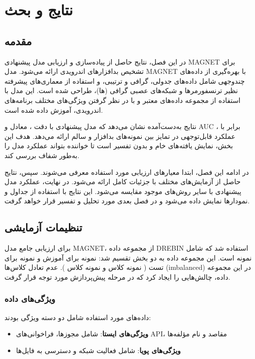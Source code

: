 \chapter{نتایج و بحث}\label{chap4}

\section{مقدمه}
در این فصل، نتایج حاصل از پیاده‌سازی و ارزیابی مدل پیشنهادی MAGNET برای تشخیص بدافزارهای اندرویدی ارائه می‌شود. مدل MAGNET با بهره‌گیری از داده‌های چندوجهی شامل داده‌های جدولی، گرافی و ترتیبی، و استفاده از معماری‌های پیشرفته نظیر ترنسفورمرها و شبکه‌های عصبی گرافی (ها)، طراحی شده است. این مدل با استفاده از مجموعه داده‌های معتبر و با در نظر گرفتن ویژگی‌های مختلف برنامه‌های اندرویدی، آموزش داده شده است.

نتایج به‌دست‌آمده نشان می‌دهد که مدل پیشنهادی با دقت ،  معادل  و AUC برابر با ، عملکرد قابل‌توجهی در تمایز بین نمونه‌های بدافزار و سالم ارائه می‌دهد. هدف این بخش، نمایش یافته‌های خام و بدون تفسیر است تا خواننده بتواند عملکرد مدل را به‌طور شفاف بررسی کند.

در ادامه این فصل، ابتدا معیارهای ارزیابی مورد استفاده معرفی می‌شوند. سپس، نتایج حاصل از آزمایش‌های مختلف با جزئیات کامل ارائه می‌شود. در نهایت، عملکرد مدل پیشنهادی با سایر روش‌های موجود مقایسه می‌شود. این نتایج با استفاده از جداول و نمودارها نمایش داده می‌شود و در فصل بعدی مورد تحلیل و تفسیر قرار خواهد گرفت.

\section{تنظیمات آزمایشی}
برای ارزیابی جامع مدل MAGNET، از مجموعه داده DREBIN \cite{Drebin} استفاده شد که شامل  نمونه است. این مجموعه داده به دو بخش تقسیم شد:  نمونه برای آموزش و  نمونه برای تست ( نمونه کلاس  و  نمونه کلاس ). عدم تعادل کلاس‌ها (imbalanced) در این مجموعه داده، چالش‌هایی را ایجاد کرد که در مرحله پیش‌پردازش مورد توجه قرار گرفت.

\subsection{ویژگی‌های داده}
داده‌های مورد استفاده شامل دو دسته ویژگی بودند:
\begin{itemize}
    \item \textbf{ویژگی‌های ایستا}: شامل مجوزها، فراخوانی‌های API، مقاصد و نام مؤلفه‌ها
    \item \textbf{ویژگی‌های پویا}: شامل فعالیت شبکه و دسترسی به فایل‌ها
\end{itemize}

